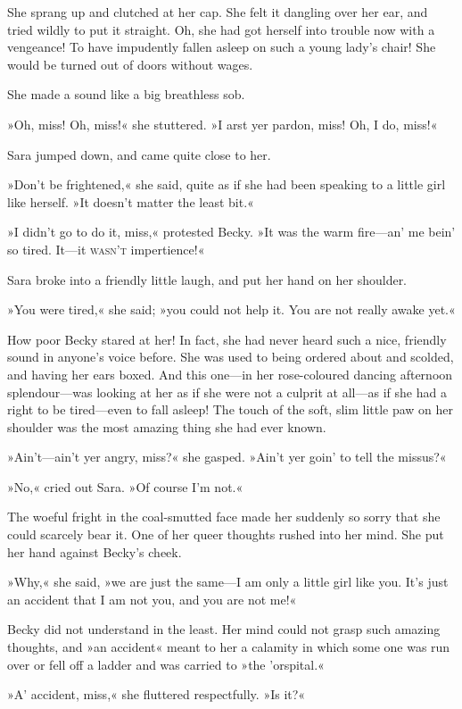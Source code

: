 She sprang up and clutched at her cap. She felt it dangling over her ear, and tried wildly to put it straight. Oh, she had got herself into trouble now with a vengeance! To have impudently fallen asleep on such a young lady's chair! She would be turned out of doors without wages.

She made a sound like a big breathless sob.

»Oh, miss! Oh, miss!« she stuttered. »I arst yer pardon, miss! Oh, I do, miss!«

Sara jumped down, and came quite close to her.

»Don't be frightened,« she said, quite as if she had been speaking to a little girl like herself. »It doesn't matter the least bit.«

»I didn't go to do it, miss,« protested Becky. »It was the warm fire—an' me bein' so tired. It—it \textsc{wasn't} impertience!«

Sara broke into a friendly little laugh, and put her hand on her shoulder.

»You were tired,« she said; »you could not help it. You are not really awake yet.«

How poor Becky stared at her! In fact, she had never heard such a nice, friendly sound in anyone's voice before. She was used to being ordered about and scolded, and having her ears boxed. And this one—in her rose-coloured dancing afternoon splendour—was looking at her as if she were not a culprit at all—as if she had a right to be tired—even to fall asleep! The touch of the soft, slim little paw on her shoulder was the most amazing thing she had ever known.

»Ain't—ain't yer angry, miss?« she gasped. »Ain't yer goin' to tell the missus?«

»No,« cried out Sara. »Of course I'm not.«

The woeful fright in the coal-smutted face made her suddenly so sorry that she could scarcely bear it. One of her queer thoughts rushed into her mind. She put her hand against Becky's cheek.

»Why,« she said, »we are just the same—I am only a little girl like you. It's just an accident that I am not you, and you are not me!«

Becky did not understand in the least. Her mind could not grasp such amazing thoughts, and »an accident« meant to her a calamity in which some one was run over or fell off a ladder and was carried to »the 'orspital.«

»A' accident, miss,« she fluttered respectfully. »Is it?«

